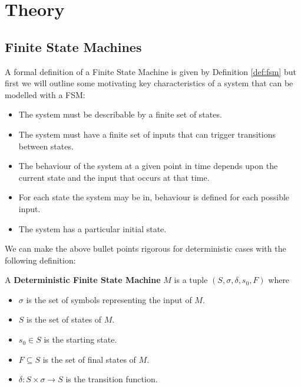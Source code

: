 
\chapter{Theory}\label{cha:theory}

\section{Finite State Machines}

A formal definition of a Finite State Machine is given by Definition \ref{def:fsm} but first we will outline some motivating key characteristics of a system that can be modelled with a FSM:

\begin{itemize}
 \item The system must be describable by a finite set of states.
 \item The system must have a finite set of inputs that can trigger transitions between states.
 \item The behaviour of the system at a given point in time depends upon the current state and the input that occurs at that time.
 \item For each state the system may be in, behaviour is defined for each possible input.
 \item The system has a particular initial state.
\end{itemize}

We can make the above bullet points rigorous for deterministic cases with the following definition:

\begin{definition}\label{def:fsm}
A \textbf{Deterministic Finite State Machine} $M$ is a tuple $(S, \sigma, \delta, s_0, F)$ where
\begin{itemize}
 \item $\sigma$ is the set of symbols representing the input of $M$.
 \item $S$ is the set of states of $M$.
 \item $s_0 \in S$ is the starting state.
 \item $F \subseteq S$ is the set of final states of $M$.
 \item $\delta: S \times \sigma \rightarrow S$ is the transition function.
\end{itemize}
\end{definition}

